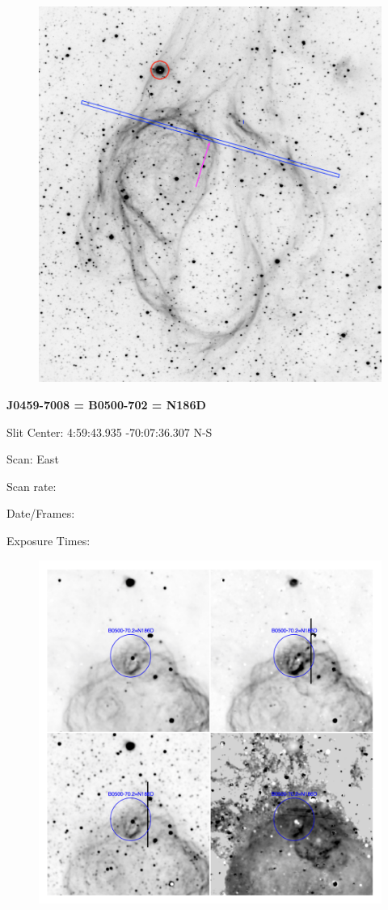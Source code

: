 \documentclass[11pt]{article}
\begin{document}
\begin{figure}
\includegraphics[width=12.5cm]{snapshots/N86_longslit.png}
\end{figure}


\newpage
{\bf J0459-7008 = B0500-702 = N186D}

Slit Center:   4:59:43.935    -70:07:36.307     N-S

Scan:  East

Scan rate:  

Date/Frames:

Exposure Times:  

\begin{figure}
\includegraphics[width=11.cm]{snapshots/B0500-702.png}
\end{figure}
\end{document}
